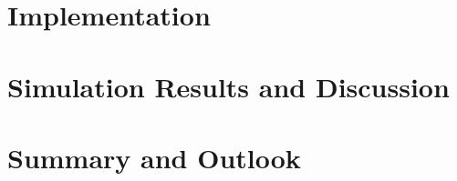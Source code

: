 \documentclass[a4paper, DIV11, abstracton]{scrartcl}
\begin{document}




\section{Implementation}




\section{Simulation Results and Discussion}

\section{Summary and Outlook}




\end{document}

